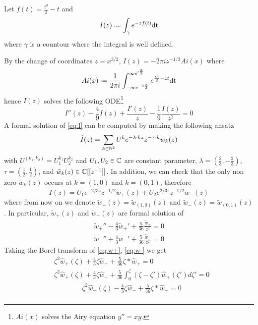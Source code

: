 \documentclass[11pt,a4paper,twoside,leqno,noamsfonts]{amsart}
\numberwithin{equation}{section}
\begin{document}
\begin{example}[Airy]
Let $f(t)=\frac{t^3}{3}-t$ and \[I(z)\defeq\int_{\gamma} e^{-zf(t)}\text{dt}\]
where $\gamma$ is a countour where the integral is well defined. 

By the change of coordinates $z=x^{3/2}$, $I(z)=-2\pi iz^{-1/3}Ai(x)$ where \[Ai(x)\defeq \frac{1}{2\pi i}\int_{-\infty e^{-i\frac{\pi}{3}}}^{\infty e^{i\frac{\pi}{3}}} e^{\frac{t^3}{3}-zt}\text{dt}\] 
hence $I(z)$ solves the following ODE\footnote{$Ai(x)$ solves the Airy equation $y''=xy$.}
\begin{equation}\label{eq:I}
I''(z)-\frac{4}{9}I(z)+\frac{I'(z)}{z}-\frac{1}{9}\frac{I(z)}{z^2}=0
\end{equation}
A formal solution of \eqref{eq:I} can be computed by making the following ansatz 
\begin{equation}
\tilde{I}(z)=\sum_{k\in\mathbb N^2}U^ke^{-\lambda\cdot k z}z^{-\tau\cdot k}w_k(z)
\end{equation}
with $U^{(k_1,k_2)}=U_1^{k_1}U_2^{k_2}$ and $U_1,U_2\in\mathbb C$ are constant parameter, $\lambda=(\frac{2}{3},-\frac{2}{3})$, $\tau=(\frac{1}{2},\frac{1}{2})$, and $\tilde{w}_k(z)\in\mathbb C[[z^{-1}]]$. In addition, we can check that the only non zero $\tilde{w}_k(z)$ occurs at $k=(1,0)$ and $k=(0,1)$, therefore
\begin{equation}
\tilde{I}(z)=U_1e^{-2/3z}z^{-1/2}\tilde{w}_{+}(z)+U_2e^{2/3z}z^{-1/2}\tilde{w}_{-}(z)
\end{equation}  
where from now on we denote $\tilde{w}_+(z)=\tilde{w}_{(1,0)}(z)$ and $\tilde{w}_-(z)=\tilde{w}_{(0,1)}(z)$. In particular, $\tilde{w}_+(z)$ and $\tilde{w}_-(z)$ are formal solution of 
\begin{align}
\label{eq:w+} \tilde{w}_+''-\frac{4}{3}\tilde{w}_+'+\frac{5}{36}\frac{\tilde{w}_+}{z^2}=0\\
\label{eq:w-} \tilde{w}_-''+\frac{4}{3}\tilde{w}_-'+\frac{5}{36}\frac{\tilde{w}_-}{z^2}=0
\end{align}
Taking the Borel transform of \eqref{eq:w+}, \eqref{eq:w-} we get
\begin{align*}
&\zeta^2\hat{w}_{+}(\zeta)+\frac{4}{3}\zeta\hat{w}_{+}+\frac{5}{36}\zeta\ast\hat{w}_{+}=0\\
&\zeta^2\hat{w}_{+}(\zeta)+\frac{4}{3}\zeta\hat{w}_{+}+\frac{5}{36}\int_0^\zeta(\zeta-\zeta')\hat{w}_{+}(\zeta')d\zeta'=0
\end{align*}
\begin{align*}
&\zeta^2\hat{w}_{-}(\zeta)-\frac{4}{3}\zeta\hat{w}_{-}+\frac{5}{36}\zeta\ast\hat{w}_{-}=0\\

\end{align*}
\end{example}
\end{document}
